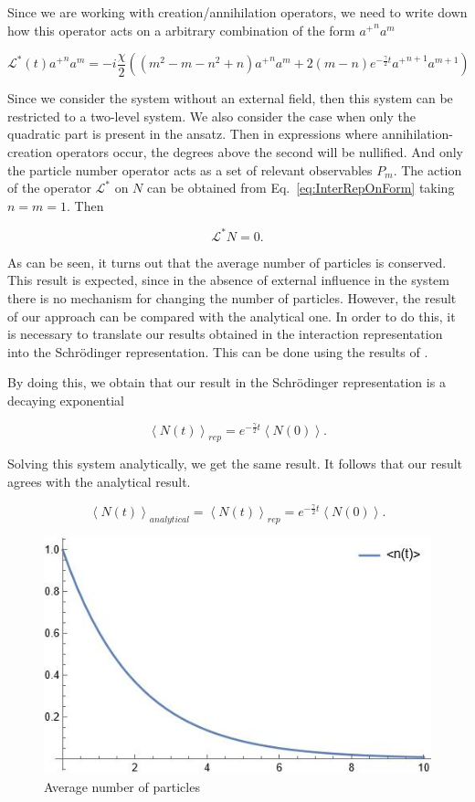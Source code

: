 \documentclass[12pt]{article}
\theoremstyle{definition}
\newcommand\bra{\left<}
\newcommand\ket{\right>}
\newcommand{\braket}[1]{\bra#1\ket}
\def\ga {\gamma}
\begin{document}
	Since we are working with creation/annihilation operators, we need to write down how this operator acts on a arbitrary combination of the form ${a^+}^na^m$
	
	\begin{equation}
		\label{eq:InterRepOnForm}
		\mathcal{L}^*(t){a^+}^na^m = -i\frac{\chi}{2}((m^2 - m - n^2 + n){a^+}^na^m + 2 (m - n) e^{-\frac{\ga}{2}t} {a^+}^{n + 1} a^{m + 1})
	\end{equation}
	
	Since we consider the system without an external field, then this system can be restricted to a two-level system. We also consider the case when only the quadratic part is present in the ansatz. Then in expressions where annihilation-creation operators occur, the degrees above the second will be nullified. And only the particle number operator acts as a set of relevant observables $P_m$. The action of the operator $\mathcal{L}^*$ on $N$ can be obtained from  Eq.~\eqref{eq:InterRepOnForm} taking $n = m = 1$. Then
	
	\begin{equation*}
		\mathcal{L}^*N = 0.
	\end{equation*}
	
	As can be seen, it turns out that the average number of particles is conserved. This result is expected, since in the absence of external influence in the system there is no mechanism for changing the number of particles. However, the result of our approach can be compared with the analytical one. In order to do this, it is necessary to translate our results obtained in the interaction representation into the Schrödinger representation. This can be done using the results of \cite{Dis}.
	
	By doing this, we obtain that our result in the Schrödinger representation is a decaying exponential
	
	\begin{equation*}
		\braket{N(t)}_{rep} = e^{-\frac{\ga}{2}t}\braket{N(0)}.
	\end{equation*}
	
	Solving this system analytically, we get the same result. It follows that our result agrees with the analytical result.
	
	\begin{equation*}
		\braket{N(t)}_{analytical } = \braket{N(t)}_{rep} = e^{-\frac{\ga}{2}t}\braket{N(0)}.
	\end{equation*}
	
	\begin{figure}[h!]
		\label{fig:NAv}
		\centering
		\includegraphics[width=0.6\linewidth]{NAnalitical.JPG}
		\caption{Average number of particles}
	\end{figure}
	
\end{document}
